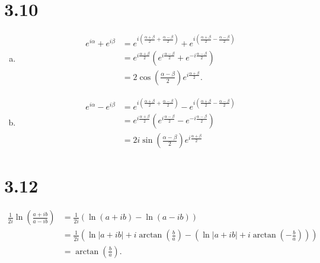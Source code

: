 \documentclass[10pt]{mypackage}
\begin{document}
\section{3.10}%
\begin{enumerate}[(a)]
  \item 
    \begin{align*}
      e^{i\alpha} + e^{i\beta} &= e^{i\left(\frac{\alpha + \beta}{2} + \frac{\alpha - \beta}{2}\right)} + e^{i\left(\frac{\alpha + \beta}{2} - \frac{\alpha - \beta}{2}\right)}\\
                               &= e^{i\frac{\alpha + \beta}{2}}\left(e^{i\frac{\alpha - \beta}{2}} + e^{-i\frac{\alpha - \beta}{2}}\right)\\
                               &= 2\cos\left(\frac{\alpha - \beta}{2}\right)e^{i\frac{\alpha + \beta}{2}}.
    \end{align*}
  \item 
    \begin{align*}
      e^{i\alpha} - e^{i\beta} &= e^{i\left(\frac{\alpha + \beta}{2} + \frac{\alpha - \beta}{2}\right)} - e^{i\left(\frac{\alpha + \beta}{2} - \frac{\alpha - \beta}{2}\right)}\\
                               &=  e^{i\frac{\alpha + \beta}{2}}\left(e^{i\frac{\alpha - \beta}{2}} - e^{-i\frac{\alpha - \beta}{2}}\right)\\
                               &= 2i\sin\left(\frac{\alpha - \beta}{2}\right)e^{i\frac{\alpha + \beta}{2}}
    \end{align*}
\end{enumerate}
\section{3.12}%
\begin{align*}
  \frac{1}{2i}\ln \left(\frac{a + ib}{ a - ib }\right) &= \frac{1}{2i}\left(\ln \left(a + ib\right) - \ln \left(a - ib\right)\right)\\
                                                       &= \frac{1}{2i}\left(\ln |a + ib| + i\arctan\left(\frac{b}{a}\right) - \left(\ln|a + ib| + i\arctan\left(-\frac{b}{a}\right)\right)\right)\\
                                                       &= \arctan\left(\frac{b}{a}\right).
\end{align*}
\end{document}
